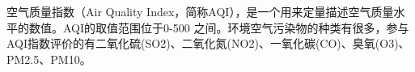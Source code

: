 \documentclass[preview]{standalone}
\begin{document}
\begin{center}
空气质量指数（Air Quality Index，简称AQI），是一个用来定量描述空气质量水平的数值。AQI的取值范围位于0-500 之间。环境空气污染物的种类有很多，参与AQI指数评价的有二氧化硫(SO2)、二氧化氮(NO2)、一氧化碳(CO)、臭氧(O3)、PM2.5、PM10。
\end{center}
\end{document}
